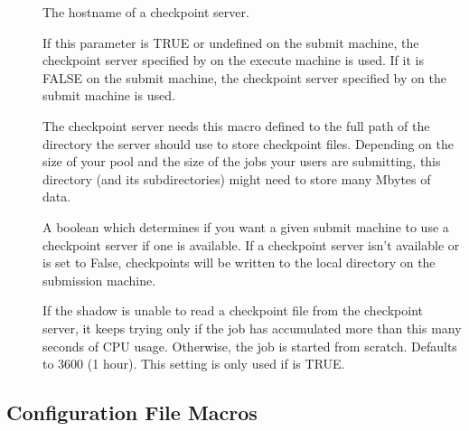 \begin{description}
  
\item[] \label{param:CkptServerHost} The
  hostname of a checkpoint server.

\item[]
  \label{param:StarterChoosesCkptServer} If this parameter is TRUE 
  or undefined on
  the submit machine, the checkpoint server specified by
   on the execute machine is used.  If it is
  FALSE on the submit machine, the checkpoint server
  specified by  on the submit machine is
  used.
  
\item[] \label{param:CkptServerDir} The
  checkpoint server needs this macro defined to the full path of the
  directory the server should use to store checkpoint files.
  Depending on the size of your pool and the size of the jobs your
  users are submitting, this directory (and its subdirectories) might
  need to store many Mbytes of data.

\item[] \label{param:UseCkptServer} A boolean
  which determines if you want a given submit machine to use a
  checkpoint server if one is available.  If a
  checkpoint server isn't available or  is set to
  False, checkpoints will be written to the local  directory on
  the submission machine.

\item[]
  \label{param:MaxDiscardedRunTime} If the shadow is unable to read a
  checkpoint file from the checkpoint server, it keeps trying only if
  the job has accumulated more than this many seconds of CPU usage.
  Otherwise, the job is started from scratch.  Defaults to 3600 (1
  hour). This setting is only used if  is
  TRUE.

\end{description}


\subsection{\label{sec:Master-Config-File-Entries}
 Configuration File Macros}

